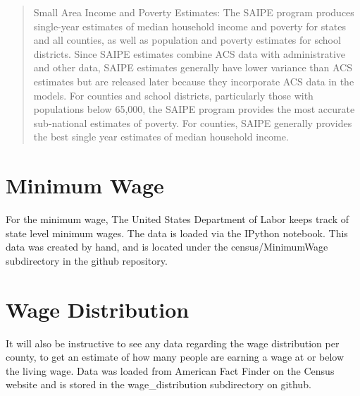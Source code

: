\begin{quote}
Small Area Income and Poverty Estimates: The SAIPE program produces single-year estimates of median household income and poverty for states and all counties, as well as population and poverty estimates for school districts. Since SAIPE estimates combine ACS data with administrative and other data, SAIPE estimates generally have lower variance than ACS estimates but are released later because they incorporate ACS data in the models. For counties and school districts, particularly those with populations below 65,000, the SAIPE program provides the most accurate sub-national estimates of poverty. For counties, SAIPE generally provides the best single year estimates of median household income.
\end{quote}


\section{Minimum Wage}

For the minimum wage, The United States Department of Labor keeps track of state level minimum wages. \cite{minimum_wage_data} The data is loaded via the IPython notebook. \cite{minimum_wage_load} This data was created by hand, and is located under the census/MinimumWage subdirectory in the github repository. 

\section{Wage Distribution}

It will also be instructive to see any data regarding the wage distribution per county, to get an estimate of how many people are earning a wage at or below the living wage. Data was loaded from American Fact Finder on the Census website \cite{wage_data} and is stored in the wage\_distribution subdirectory on github.